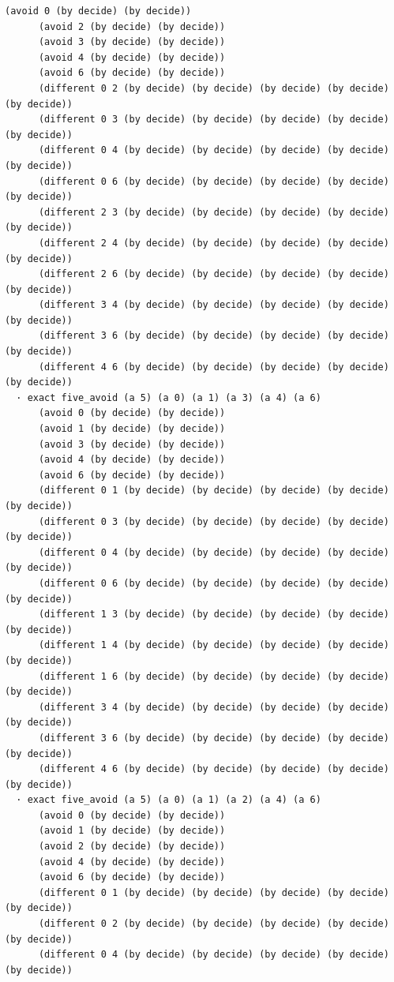 \documentclass[11pt,a4paper]{article}
\begin{document}
\begin{Verbatim}[breaklines,breakanywhere,fontsize=\footnotesize]
      (avoid 0 (by decide) (by decide))
      (avoid 2 (by decide) (by decide))
      (avoid 3 (by decide) (by decide))
      (avoid 4 (by decide) (by decide))
      (avoid 6 (by decide) (by decide))
      (different 0 2 (by decide) (by decide) (by decide) (by decide) (by decide))
      (different 0 3 (by decide) (by decide) (by decide) (by decide) (by decide))
      (different 0 4 (by decide) (by decide) (by decide) (by decide) (by decide))
      (different 0 6 (by decide) (by decide) (by decide) (by decide) (by decide))
      (different 2 3 (by decide) (by decide) (by decide) (by decide) (by decide))
      (different 2 4 (by decide) (by decide) (by decide) (by decide) (by decide))
      (different 2 6 (by decide) (by decide) (by decide) (by decide) (by decide))
      (different 3 4 (by decide) (by decide) (by decide) (by decide) (by decide))
      (different 3 6 (by decide) (by decide) (by decide) (by decide) (by decide))
      (different 4 6 (by decide) (by decide) (by decide) (by decide) (by decide))
  · exact five_avoid (a 5) (a 0) (a 1) (a 3) (a 4) (a 6)
      (avoid 0 (by decide) (by decide))
      (avoid 1 (by decide) (by decide))
      (avoid 3 (by decide) (by decide))
      (avoid 4 (by decide) (by decide))
      (avoid 6 (by decide) (by decide))
      (different 0 1 (by decide) (by decide) (by decide) (by decide) (by decide))
      (different 0 3 (by decide) (by decide) (by decide) (by decide) (by decide))
      (different 0 4 (by decide) (by decide) (by decide) (by decide) (by decide))
      (different 0 6 (by decide) (by decide) (by decide) (by decide) (by decide))
      (different 1 3 (by decide) (by decide) (by decide) (by decide) (by decide))
      (different 1 4 (by decide) (by decide) (by decide) (by decide) (by decide))
      (different 1 6 (by decide) (by decide) (by decide) (by decide) (by decide))
      (different 3 4 (by decide) (by decide) (by decide) (by decide) (by decide))
      (different 3 6 (by decide) (by decide) (by decide) (by decide) (by decide))
      (different 4 6 (by decide) (by decide) (by decide) (by decide) (by decide))
  · exact five_avoid (a 5) (a 0) (a 1) (a 2) (a 4) (a 6)
      (avoid 0 (by decide) (by decide))
      (avoid 1 (by decide) (by decide))
      (avoid 2 (by decide) (by decide))
      (avoid 4 (by decide) (by decide))
      (avoid 6 (by decide) (by decide))
      (different 0 1 (by decide) (by decide) (by decide) (by decide) (by decide))
      (different 0 2 (by decide) (by decide) (by decide) (by decide) (by decide))
      (different 0 4 (by decide) (by decide) (by decide) (by decide) (by decide))

\end{Verbatim}
\end{document}
